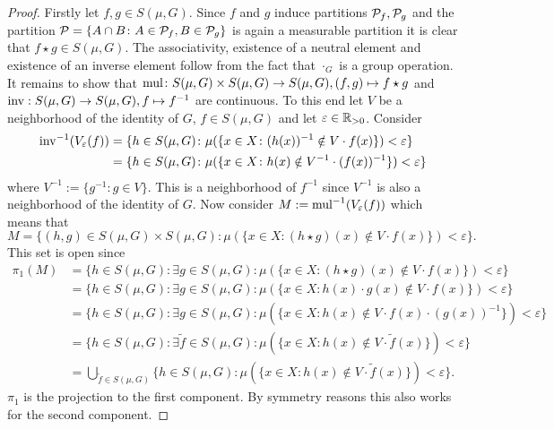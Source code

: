\begin{proof}
  Firstly let $f, g \in S(\mu, G)$. Since $f$ and $g$ induce partitions $\P_f, \P_g$ and the partition $\P = \{A \cap B\colon A \in \P_f, B \in \P_g\}$ is again a measurable partition it is clear that $f \star g \in S(\mu, G)$. The associativity, existence of a neutral element and existence of an inverse element follow from the fact that $\cdot_G$ is a group operation.
  It remains to show that ${\rm mul}\colon S(\mu, G)\times S(\mu, G) \to S(\mu, G), (f, g) \mapsto f\star g$ and ${\rm inv}: S(\mu, G) \to S(\mu, G), f \mapsto f^{-1}$ are continuous. To this end let $V$ be a neighborhood of the identity of $G$, $f \in S(\mu, G)$ and let $\varepsilon \in \R_{>0}$. Consider
  \begin{align*}
    {\rm inv}^{-1}(V_\varepsilon(f)) &= \{h \in S(\mu, G)\colon \mu(\{x \in X\colon (h(x))^{-1} \notin V\cdot f(x)\}) < \varepsilon\} \\
    &= \{h \in S(\mu, G)\colon \mu(\{x \in X\colon h(x) \notin V^{-1}\cdot (f(x))^{-1}\}) < \varepsilon\}
  \end{align*}
  where $V^{-1} := \{g^{-1}\colon g \in V\}$.
  This is a neighborhood of $f^{-1}$ since $V^{-1}$ is also a neighborhood of the identity of $G$. 
  Now consider $M := {\rm mul}^{-1}(V_\varepsilon(f))$ which means that \[M = \{(h, g) \in S(\mu, G) \times S(\mu, G)\colon \mu(\{x \in X\colon (h \star g)(x) \notin V\cdot f(x)\}) < \varepsilon\}.\]
  This set is open since
  \begin{align*}
    \pi_1(M) &= \{h \in S(\mu, G)\colon \exists g\in S(\mu, G)\colon \mu(\{x \in X\colon (h \star g)(x) \notin V\cdot f(x)\}) < \varepsilon\} \\
    &= \{h \in S(\mu, G)\colon \exists g\in S(\mu, G)\colon \mu(\{x \in X\colon h(x) \cdot g(x) \notin V\cdot f(x)\}) < \varepsilon\} \\
    &= \{h \in S(\mu, G)\colon \exists g\in S(\mu, G)\colon \mu(\{x \in X\colon h(x) \notin V\cdot f(x) \cdot (g(x))^{-1}\}) < \varepsilon\} \\
    &= \{h \in S(\mu, G)\colon \exists \tilde{f}\in S(\mu, G)\colon \mu(\{x \in X\colon h(x) \notin V\cdot \tilde{f}(x)\}) < \varepsilon\} \\
    &= \bigcup\limits_{\tilde{f} \in S(\mu, G)}\{h \in S(\mu, G)\colon \mu(\{x \in X\colon h(x) \notin V\cdot \tilde{f}(x)\}) < \varepsilon\}.
  \end{align*}
  $\pi_1$ is the projection to the first component. By symmetry reasons this also works for the second component.
\end{proof}

